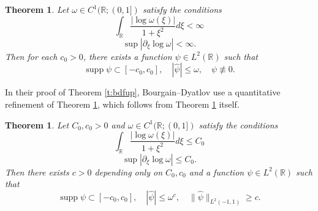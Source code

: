 \documentclass[reqno,12pt,letterpaper]{amsart}
\newtheorem{thm}[prop]{Theorem}
\numberwithin{equation}{section}
\numberwithin{prop}{section}
\DeclareMathOperator{\supp}{supp}
\begin{document}
\begin{thm}
\label{t:bmm}
Let $\omega\in C^1(\mathbb{R};(0,1])$ satisfy the conditions
\begin{equation*}
\int_\mathbb{R}\frac{|\log\omega(\xi)|}{1+\xi^2}d\xi<\infty
\end{equation*}
\begin{equation*}
\sup|\partial_\xi\log\omega|<\infty.
\end{equation*}
Then for each $c_0>0$, there exists a function $\psi\in L^2(\mathbb{R})$ such that 
\begin{equation*}
\supp\psi\subset[-c_0,c_0],\quad |\widehat{\psi}|\leq\omega, \quad\psi\not\equiv0.
\end{equation*}
\end{thm}


In their proof of Theorem \ref{t:bdfup}, Bourgain--Dyatlov use a quantitative refinement of Theorem \ref{t:bmm}, which follows from Theorem \ref{t:bmm} itself.

\begin{thm}
\label{t:bdbmm}
Let $C_0,c_0>0$ and $\omega\in C^1(\mathbb{R};(0,1])$ satisfy the conditions
\begin{equation*}
\int_\mathbb{R}\frac{|\log\omega(\xi)|}{1+\xi^2}d\xi\leq C_0
\end{equation*}
\begin{equation}
\label{e:lipschitz}
\sup|\partial_\xi\log\omega|\leq C_0.
\end{equation}
Then there exists $c>0$ depending only on $C_0,c_0$ and a function $\psi\in L^2(\mathbb{R})$ such that 
\begin{equation*}
\supp\psi\subset[-c_0,c_0],\quad |\widehat{\psi}|\leq\omega^c, \quad\|\widehat{\psi}\|_{L^2(-1,1)}\geq c.
\end{equation*}
\end{thm}
\end{document}
